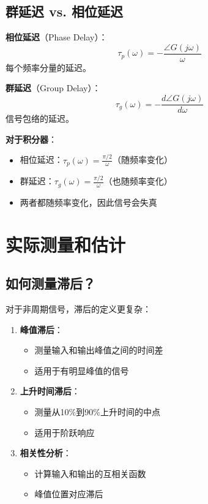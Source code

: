 \documentclass[12pt,a4paper]{article}
\begin{document}
\subsection{群延迟 vs. 相位延迟}

\textbf{相位延迟}（Phase Delay）：
\begin{equation}
\tau_p(\omega) = -\frac{\angle G(j\omega)}{\omega}
\end{equation}
每个频率分量的延迟。

\textbf{群延迟}（Group Delay）：
\begin{equation}
\tau_g(\omega) = -\frac{d\angle G(j\omega)}{d\omega}
\end{equation}
信号包络的延迟。

\textbf{对于积分器}：
\begin{itemize}
\item 相位延迟：$\tau_p(\omega) = \frac{\pi/2}{\omega}$（随频率变化）
\item 群延迟：$\tau_g(\omega) = \frac{\pi/2}{\omega}$（也随频率变化）
\item 两者都随频率变化，因此信号会失真
\end{itemize}

\section{实际测量和估计}

\subsection{如何测量滞后？}

对于非周期信号，滞后的定义更复杂：

\begin{enumerate}
\item \textbf{峰值滞后}：
\begin{itemize}
\item 测量输入和输出峰值之间的时间差
\item 适用于有明显峰值的信号
\end{itemize}

\item \textbf{上升时间滞后}：
\begin{itemize}
\item 测量从10\%到90\%上升时间的中点
\item 适用于阶跃响应
\end{itemize}

\item \textbf{相关性分析}：
\begin{itemize}
\item 计算输入和输出的互相关函数
\item 峰值位置对应滞后
\end{itemize}
\end{enumerate}
\end{document}
